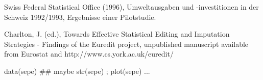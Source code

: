 %
\begin{References}\relax
Swiss Federal Statistical Office (1996), Umweltausgaben und -investitionen in der Schweiz 1992/1993, Ergebnisse einer Pilotstudie.

Charlton, J. (ed.), Towards Effective Statistical Editing and Imputation Strategies -
Findings of the Euredit project, unpublished manuscript available from Eurostat and http://www.cs.york.ac.uk/euredit/

\end{References}
%
\begin{Examples}
\begin{ExampleCode}
data(sepe)
## maybe str(sepe) ; plot(sepe) ...
\end{ExampleCode}
\end{Examples}
